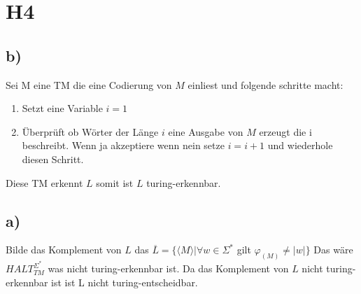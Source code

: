 \section*{H4}

\subsection{b)}
Sei M eine TM die eine Codierung von $M$ einliest und folgende schritte macht:\\
\begin{enumerate}
\item
Setzt eine Variable $i=1$
\item
Überprüft ob Wörter der Länge $i$ eine Ausgabe von $M$ erzeugt die i beschreibt. Wenn ja akzeptiere wenn nein setze $i=i+1$ und wiederhole diesen Schritt.
\end{enumerate}
Diese TM erkennt $L$ somit ist $L$ turing-erkennbar.

\subsection{a)}
Bilde das Komplement von $L$ das $\overline{L} = \{ \langle M \rangle | \forall w \in \Sigma^* $ gilt $ \varphi_{(M)} \neq |w| \}$ 
Das wäre $HALT^{\Sigma^*}_{TM}$ was nicht turing-erkennbar ist.
Da das Komplement von $L$ nicht turing-erkennbar ist ist L nicht turing-entscheidbar.
